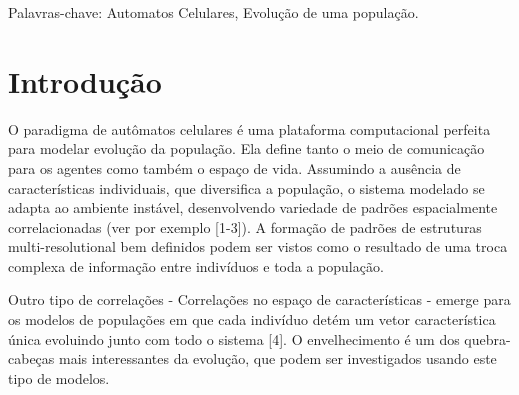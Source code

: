 \documentclass{article}
\begin{document}
Palavras-chave: Automatos Celulares, Evolução de uma população.


\section{Introdução}


O paradigma de autômatos celulares é uma plataforma computacional perfeita para modelar evolução da população. Ela define tanto o meio de comunicação para os agentes como também o espaço de vida. Assumindo a ausência de características individuais, que diversifica a população, o sistema modelado se adapta ao ambiente instável, desenvolvendo variedade de padrões espacialmente correlacionadas (ver por exemplo [1-3]). A formação de padrões de estruturas multi-resolutional bem definidos podem ser vistos como o resultado de uma troca complexa de informação entre indivíduos e toda a população.


Outro tipo de correlações - Correlações no espaço de características - emerge para os modelos de populações em que cada indivíduo detém um vetor característica única evoluindo junto com todo o sistema [4]. O envelhecimento é um dos quebra-cabeças mais interessantes da evolução, que podem ser investigados usando este tipo de modelos.

\end{document}
